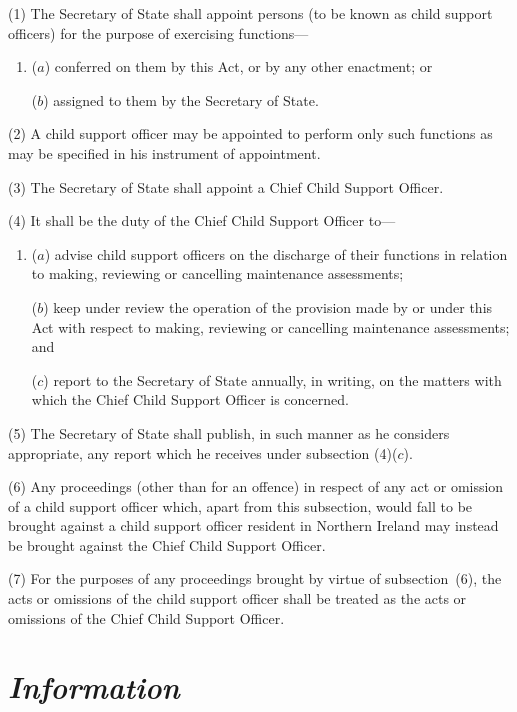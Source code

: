 \documentclass[12pt,a4paper]{article}
\begin{document}
(1) The Secretary of State shall appoint persons (to be known as child support officers) for the purpose of exercising functions—
\begin{enumerate}\item[]
($a$) conferred on them by this Act, or by any other enactment; or

($b$) assigned to them by the Secretary of State.
\end{enumerate}

(2) A child support officer may be appointed to perform only such functions as may be specified in his instrument of appointment.

(3) The Secretary of State shall appoint a Chief Child Support Officer.

(4) It shall be the duty of the Chief Child Support Officer to—
\begin{enumerate}\item[]
($a$) advise child support officers on the discharge of their functions in relation to making, reviewing or cancelling maintenance assessments;

($b$) keep under review the operation of the provision made by or under this Act with respect to making, reviewing or cancelling maintenance assessments; and

($c$) report to the Secretary of State annually, in writing, on the matters with which the Chief Child Support Officer is concerned.
\end{enumerate}

(5) The Secretary of State shall publish, in such manner as he considers appropriate, any report which he receives under subsection (4)($c$).

(6) Any proceedings (other than for an offence) in respect of any act or omission of a child support officer which, apart from this subsection, would fall to be brought against a child support officer resident in Northern Ireland may instead be brought against the Chief Child Support Officer.

(7) For the purposes of any proceedings brought by virtue of subsection~(6), the acts or omissions of the child support officer shall be treated as the acts or omissions of the Chief Child Support Officer.


\section{\itshape Information}
\end{document}
